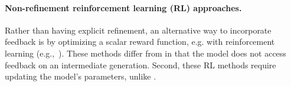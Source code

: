\paragraph{Non-refinement reinforcement learning (RL) approaches.}
Rather than having explicit refinement, an alternative way to incorporate feedback is by optimizing a scalar reward function, e.g. with reinforcement learning (e.g.,~\citet{stiennon2020learning,Lu2022QuarkCT,Le2022CodeRL}).
These methods differ from \ours 
in that the model does not access feedback on an intermediate generation. 
Second, these RL methods require updating the model's parameters, unlike \ours. %





